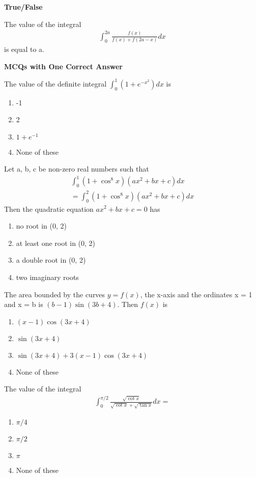 \textbf{ True/False}

\item The value of the integral 
\begin{align*}
\int_{0}^{2a}\frac{f(x)}{f(x) + f(2a - x)}dx
\end{align*}
is equal to a.

\textbf{ MCQs with One Correct Answer}

\item The value of the definite integral $\int_{0}^{1}(1 + e^{-x^{2}})dx$ is
\begin{enumerate}
\item -1
\item 2
\item $1 + e^{-1}$
\item None of these
\end{enumerate} 

\item Let a, b, c be non-zero real numbers such that
\begin{align*}
\int_{0}^{1}(1+\cos^{8}x)(ax^2+bx+c)dx\\=\int_{0}^{2}(1+\cos^{8}x)(ax^2+bx+c)dx
\end{align*}
Then the quadratic equation $ax^2 + bx + c = 0$ has
\begin{enumerate}
\item no root in (0, 2)
\item at least one root in (0, 2)
\item a double root in (0, 2)
\item two imaginary roots
\end{enumerate}

\item The area bounded by the curves $y = f(x)$, the x-axis and the ordinates x = 1 and x = b is $(b - 1)\sin(3b + 4)$. Then $f(x)$ is
\begin{enumerate}
\item $(x - 1)\cos(3x + 4)$
\item $\sin(3x + 4)$
\item $\sin(3x + 4) + 3(x - 1)\cos(3x + 4)$
\item None of these
\end{enumerate}

\item The value of the integral
\begin{align*}
\int_{0}^{\pi/2}\frac{\sqrt{\cot x}}{\sqrt{\cot x} + \sqrt{\tan x}}dx = 
\end{align*}
\begin{enumerate}
\item $\pi/4$
\item $\pi/2$
\item $\pi$
\item None of these
\end{enumerate}

